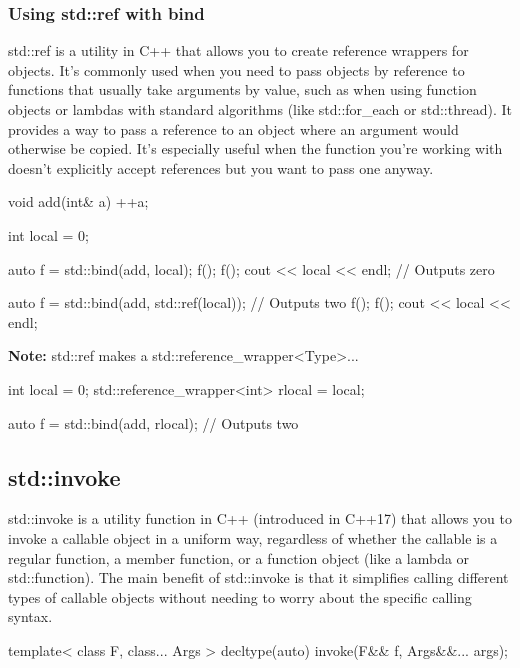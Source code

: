 \documentclass{report}
\begin{document}
    \subsubsection{Using std::ref with bind}
    \bigbreak \noindent 
    std::ref is a utility in C++ that allows you to create reference wrappers for objects. It's commonly used when you need to pass objects by reference to functions that usually take arguments by value, such as when using function objects or lambdas with standard algorithms (like std::for\_each or std::thread).
    \bigbreak \noindent 
    It provides a way to pass a reference to an object where an argument would otherwise be copied.
    \bigbreak \noindent 
    It’s especially useful when the function you're working with doesn’t explicitly accept references but you want to pass one anyway.
    \bigbreak \noindent 
    \begin{cppcode}
        void add(int& a) {
            ++a;
        }

        int local = 0;

        auto f = std::bind(add, local);
        f();
        f();
        cout << local << endl; // Outputs zero

        auto f = std::bind(add, std::ref(local)); // Outputs two
        f();
        f();
        cout << local << endl;
    \end{cppcode}

    \bigbreak \noindent 
    \textbf{Note:} std::ref makes a std::reference\_wrapper<Type>...
    \bigbreak \noindent 
    \begin{cppcode}
        int local = 0;
        std::reference_wrapper<int> rlocal = local; 

        auto f = std::bind(add, rlocal); // Outputs two
    \end{cppcode}

     \pagebreak 
     \subsection{std::invoke}
     \bigbreak \noindent 
     std::invoke is a utility function in C++ (introduced in C++17) that allows you to invoke a callable object in a uniform way, regardless of whether the callable is a regular function, a member function, or a function object (like a lambda or std::function). The main benefit of std::invoke is that it simplifies calling different types of callable objects without needing to worry about the specific calling syntax.
     \bigbreak \noindent 
     \begin{cppcode}
         template< class F, class... Args >
         decltype(auto) invoke(F&& f, Args&&... args);
     \end{cppcode}
\end{document}
